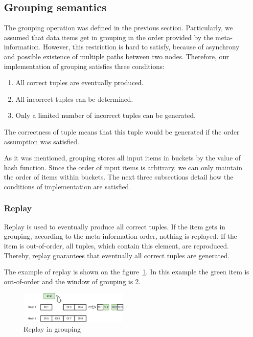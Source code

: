 
\label  {fs-implementation-section}

\subsection{Grouping semantics}
The grouping operation was defined in the previous section. Particularly, we assumed that data items get in grouping in the order provided by the meta-information. However, this restriction is hard to satisfy, because of asynchrony and possible existence of multiple paths between two nodes. Therefore, our implementation of grouping satisfies three conditions:

\begin{enumerate}
\item All correct tuples are eventually produced.
\item All incorrect tuples can be determined.
\item Only a limited number of incorrect tuples can be generated.
\end{enumerate}

The correctness of tuple means that this tuple would be generated if the order assumption was satisfied. 

As it was mentioned, grouping stores all input items in buckets by the value of hash function. Since the order of input items is arbitrary, we can only maintain the order of items within buckets. The next three subsections detail how the conditions of implementation are satisfied.

\subsubsection{Replay}

Replay is used to eventually produce all correct tuples. If the item gets in grouping, according to the meta-information order, nothing is replayed. If the item is out-of-order, all tuples, which contain this element, are reproduced. Thereby, replay guarantees that eventually all correct tuples are generated.

The example of replay is shown on the figure~\ref{grouping-replaying-figure}. In this example the green item is out-of-order and the window of grouping is 2.

\begin{figure}[htbp]
  \centering
  \includegraphics[width=0.48\textwidth]{pics/grouping-replaying}
  \caption{Replay in grouping}
  \label {grouping-replaying-figure}
\end{figure}

